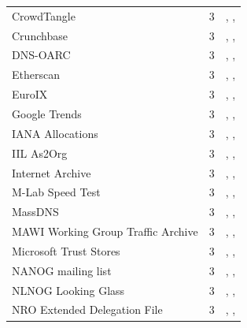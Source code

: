 \documentclass[11pt,a4paper]{article}
\begin{document}
\begin{longtable}{@{}p{} p{}p{}@{}}
CrowdTangle & 3 & \cite{10.1145/3487552.3487859}, \cite{10.1007/978-3-031-28486-1_8}, \cite{10.1145/3618257.3624812} \\
Crunchbase  & 3 & \cite{10.1145/3618257.3624803}, \cite{10.1145/3487552.3487853}, \cite{10.1145/3777912.3809155} \\
DNS-OARC & 3 & \cite{10.1145/3730567.3764428}, \cite{10.1007/978-3-030-72582-2_23}, \cite{10.1145/3777912.3839813} \\
Etherscan & 3 & \cite{10.1145/3730567.3764476}, \cite{10.1145/3517745.3561469}, \cite{10.1145/3777912.3809150} \\
EuroIX  & 3 & \cite{10.1145/3517745.3561443}, \cite{10.1007/978-3-030-98785-5_10}, \cite{10.1007/978-3-030-98785-5_16} \\
Google Trends  & 3 & \cite{10.1145/3618257.3624823}, \cite{10.1145/3517745.3561428}, \cite{10.1145/3777912.3839818} \\
IANA Allocations  & 3 & \cite{10.1145/3730567.3764452}, \cite{10.1145/3517745.3561446}, \cite{10.1145/3487552.3487825} \\
IIL As2Org & 3 & \cite{10.1145/3777912.3839831}, \cite{10.1145/3777912.3809155}, \cite{10.1145/3777912.3839828} \\
Internet Archive  & 3 & \cite{10.1145/3646547.3689010}, \cite{10.1145/3517745.3561437}, \cite{10.1007/978-3-031-28486-1_8} \\
M-Lab Speed Test  & 3 & \cite{10.1145/3517745.3561422}, \cite{10.1145/3517745.3561441}, \cite{10.1145/3487552.3487862} \\
MassDNS & 3 & \cite{10.1007/978-3-030-98785-5_13}, \cite{10.1007/978-3-032-18268-5_5}, \cite{10.1007/978-3-032-18268-5_10} \\
MAWI Working Group Traffic Archive  & 3 & \cite{10.1007/978-3-030-72582-2_32}, \cite{10.1007/978-3-030-98785-5_9}, \cite{10.1007/978-3-031-56252-5_12} \\
Microsoft Trust Stores  & 3 & \cite{10.1145/3618257.3624815}, \cite{10.1007/978-3-030-72582-2_11}, \cite{10.1007/978-3-031-28486-1_4} \\
NANOG mailing list & 3 & \cite{10.1145/3487552.3487838}, \cite{10.1007/978-3-032-18268-5_5}, \cite{10.1145/3777912.3839829} \\
NLNOG Looking Glass & 3 & \cite{10.1145/3618257.3624838}, \cite{10.1145/3646547.3689008}, \cite{10.1145/3777912.3809149} \\
NRO Extended Delegation File  & 3 & \cite{10.1007/978-3-031-56249-5_8}, \cite{10.1007/978-3-031-56252-5_11}, \cite{10.1007/978-3-032-18268-5_14} \\

\end{longtable}
\end{document}
